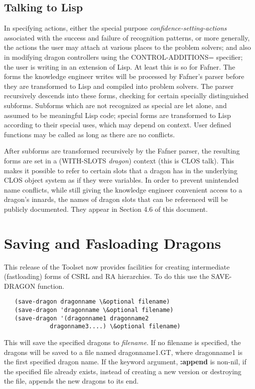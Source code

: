 \section{Talking to Lisp}

In specifying actions, either the special purpose
{\it confidence-setting-actions\/} associated with the success and
failure of recognition patterns, or more generally, the actions the
user may attach at various places to the problem solvers; and also in
modifying dragon controllers using the CONTROL-ADDITIONS= specifier;
the user is writing in an extension of Lisp.  At least this is so for
Fafner.  The forms the knowledge engineer writes will be processed by
Fafner's
parser before they are transformed to Lisp and compiled into problem
solvers.  The parser recursively descends into these forms,
checking for certain specially distinguished subforms.  Subforms which
are not recognized as special are let alone, and assumed to be
meaningful Lisp code; special forms are transformed to Lisp according
to their special uses, which may depend on context.  User defined
functions may be called as long as there are no conflicts.

After subforms are transformed recursively by the Fafner parser, the
resulting forms are set in a (WITH-SLOTS {\it dragon\/}) context (this is
CLOS talk).  This makes it possible to refer to certain slots that a
dragon has in the underlying CLOS object system as if they were
variables.  In order to prevent unintended name conflicts, while still
giving the knowledge engineer convenient access to a dragon's innards,
the names of dragon slots that can be referenced will be publicly
documented.  They appear in Section 4.6 of this document.




\chapter {Saving and Fasloading Dragons}

	This release of the Toolset now provides facilities for creating
intermediate (fastloading) forms of CSRL and RA hierarchies. To do this
use the SAVE-DRAGON function.
\begin{verbatim}
   (save-dragon dragonname \&optional filename)
   (save-dragon 'dragonname \&optional filename)
   (save-dragon '(dragonname1 dragonname2 
             dragonname3....) \&optional filename)
\end{verbatim}
This will save the specified dragons to {\it filename}. If no filename
is specified, the dragons will be saved to a file named
dragonname1.GT, where dragonname1 is the first specified dragon name.
If the keyword argument, {\bf :append} is non-nil, if the specified
file already exists, instead of creating a new version or destroying
the file, appends the new dragons to its end.

